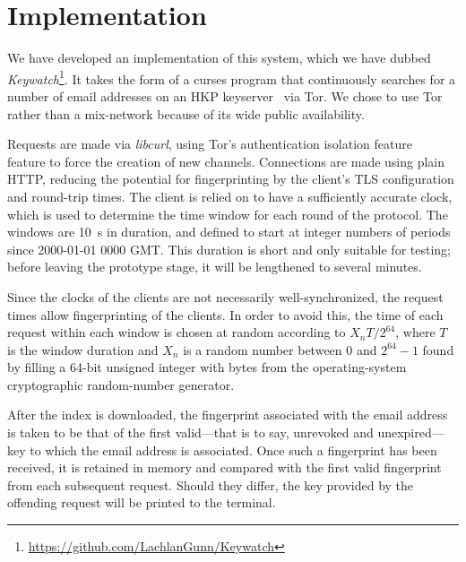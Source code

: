 \documentclass[USenglish]{llncs}
\begin{document}



\appendix
\section{Implementation}\label{sec:impl}
We have developed an implementation of this system, which we have dubbed
\emph{Keywatch}\footnote{\url{https://github.com/LachlanGunn/Keywatch}}.  It takes the form of a curses
program that continuously searches for a number of email addresses on an
HKP keyserver~\cite{hkp} via Tor.  We chose to use Tor rather than
a mix-network because of its wide public availability.

Requests are made via \emph{libcurl}, using Tor's authentication isolation
feature~\cite[\emph{IsolateSocksAuth}]{tor-torrc-documentation} feature to force the creation of new
channels.  Connections are made using plain HTTP, reducing the potential
for fingerprinting by the client's TLS configuration and round-trip times.
The client is relied on to have a sufficiently accurate clock, which is used
to determine the time window for each round of the protocol.  The windows
are \SI{10}{\second} in duration, and defined to start at integer numbers
of periods since 2000-01-01 0000 GMT. This duration is short and only suitable
for testing; before leaving the prototype stage, it will be lengthened to
several minutes.

Since the clocks of the clients are not necessarily well-synchronized, 
the request times allow fingerprinting of the clients.  In order to avoid this,
the time of each request within each window is chosen at random according
to $X_n T /{2^{64}}$, where $T$ is the window duration and $X_n$ is a
random number between $0$ and $2^{64} - 1$ found
by filling a 64-bit unsigned integer with bytes from the operating-system
cryptographic random-number generator.

After the index is downloaded, the fingerprint associated with the email
address is taken to be that of the first valid---that is to say, unrevoked
and unexpired---key to which the email address is associated.  Once such
a fingerprint has been received, it is retained in memory and compared
with the first valid fingerprint from each subsequent request.  Should they
differ, the key provided by the offending request will be printed to the
terminal.
\end{document}
